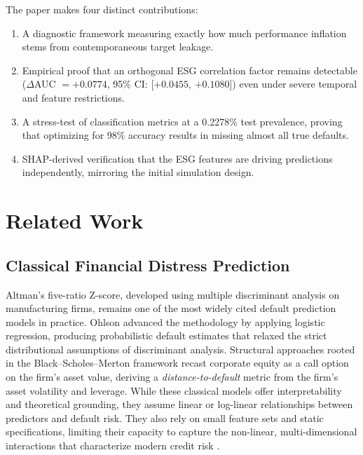 \documentclass[sigconf,anonymous]{acmart}
\begin{document}
The paper makes four distinct contributions:
\begin{enumerate}
    \item A diagnostic framework measuring exactly how much performance inflation stems from contemporaneous target leakage.
    \item Empirical proof that an orthogonal ESG correlation factor remains detectable ($\Delta$AUC $= +0.0774$, 95\% CI: [$+0.0455$, $+0.1080$]) even under severe temporal and feature restrictions.
    \item A stress-test of classification metrics at a 0.2278\% test prevalence, proving that optimizing for 98\% accuracy results in missing almost all true defaults.
    \item SHAP-derived verification that the ESG features are driving predictions independently, mirroring the initial simulation design.
\end{enumerate}


\section{Related Work}

\subsection{Classical Financial Distress Prediction}
Altman's \cite{altman1968} five-ratio Z-score, developed using multiple discriminant analysis on manufacturing firms, remains one of the most widely cited default prediction models in practice. Ohlson \cite{ohlson1980} advanced the methodology by applying logistic regression, producing probabilistic default estimates that relaxed the strict distributional assumptions of discriminant analysis. Structural approaches rooted in the Black--Scholes--Merton framework \cite{merton1974} recast corporate equity as a call option on the firm's asset value, deriving a \textit{distance-to-default} metric from the firm's asset volatility and leverage. While these classical models offer interpretability and theoretical grounding, they assume linear or log-linear relationships between predictors and default risk. They also rely on small feature sets and static specifications, limiting their capacity to capture the non-linear, multi-dimensional interactions that characterize modern credit risk \cite{jones2017}.
\end{document}
